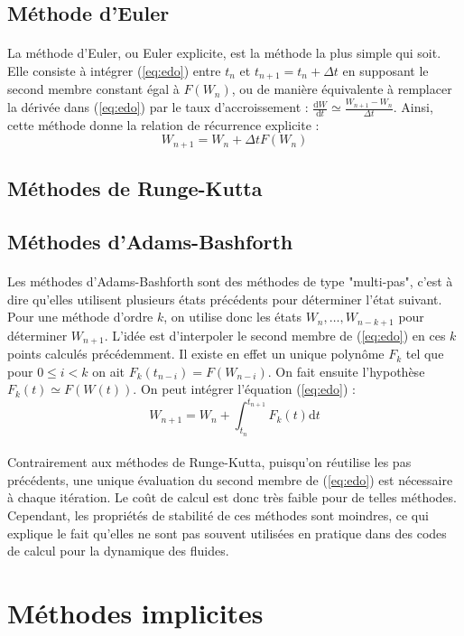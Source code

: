   \subsection{Méthode d'Euler}

    \paragraph{}
    La méthode d'Euler, ou Euler explicite, est la méthode la plus simple qui soit.
    Elle consiste à intégrer (\ref{eq:edo}) entre $t_n$ et $t_{n+1} = t_n + \Delta t$ en supposant le second membre constant égal à $F\left(W_n\right)$, ou de manière équivalente à remplacer la dérivée dans (\ref{eq:edo}) par le taux d'accroissement : $\frac{\mathrm{d}W}{\mathrm{d}t}\simeq\frac{W_{n+1}-W_n}{\Delta t}$.
    Ainsi, cette méthode donne la relation de récurrence explicite :
    $$W_{n+1} = W_n + \Delta t F\left(W_n\right)$$


  \subsection{Méthodes de Runge-Kutta}

  \subsection{Méthodes d'Adams-Bashforth}

    \paragraph{}
    Les méthodes d'Adams-Bashforth sont des méthodes de type "multi-pas", c'est à dire qu'elles utilisent plusieurs états précédents pour déterminer l'état suivant.
    Pour une méthode d'ordre $k$, on utilise donc les états $W_n, \dots, W_{n-k+1}$ pour déterminer $W_{n+1}$.
    L'idée est d'interpoler le second membre de (\ref{eq:edo}) en ces $k$ points calculés précédemment.
    Il existe en effet un unique polynôme $F_k$ tel que pour $0 \leq i < k$ on ait $F_k\left(t_{n-i}\right) = F\left(W_{n-i}\right)$.
    On fait ensuite l'hypothèse $F_k\left(t\right) \simeq F\left(W\left(t\right)\right)$.
    On peut intégrer l'équation (\ref{eq:edo}) :
    $$W_{n+1} = W_n + \int_{t_n}^{t_{n+1}}F_k\left(t\right)\mathrm{d}t$$

    \paragraph{}
    Contrairement aux méthodes de Runge-Kutta, puisqu'on réutilise les pas précédents, une unique évaluation du second membre de (\ref{eq:edo}) est nécessaire à chaque itération.
    Le coût de calcul est donc très faible pour de telles méthodes.
    Cependant, les propriétés de stabilité de ces méthodes sont moindres, ce qui explique le fait qu'elles ne sont pas souvent utilisées en pratique dans des codes de calcul pour la dynamique des fluides.





\section{Méthodes implicites}

